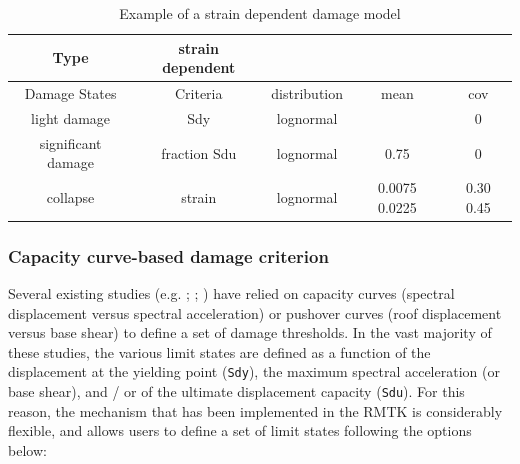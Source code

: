 \begin {table}[htb]
\caption{Example of a strain dependent damage model}
\label{table:strain_dmg}
\begin{center}
  \begin{tabular}{ | c | c | c | c | c |}
  \hline
Type & strain dependent &  &  &  \\ \hline
Damage States & Criteria & distribution & mean & cov  \\ \hline
light damage & Sdy & lognormal &  & 0 \\ \hline
significant damage & fraction Sdu & lognormal & 0.75 & 0 \\ \hline
collapse & strain & lognormal & 0.0075 0.0225 & 0.30 0.45 \\ \hline
  \end{tabular}
\end{center}
\end{table}

\subsubsection{Capacity curve-based damage criterion}
\label{subsubsec:strain-dmg}
Several existing studies (e.g. \cite{Erberik2008}; \cite{SilvaEtAl2014c}; \cite{CasottoEtAl2005}) have relied on capacity curves (spectral displacement versus spectral acceleration) or pushover curves (roof displacement versus base shear) to define a set of damage thresholds. In the vast majority of these studies, the various limit states are defined as a function of the displacement at the yielding point (\verb=Sdy=), the maximum spectral acceleration (or base shear), and / or of the ultimate displacement capacity (\verb=Sdu=). For this reason, the mechanism that has been implemented in the RMTK is considerably flexible, and allows users to define a set of limit states following the options below:\\

